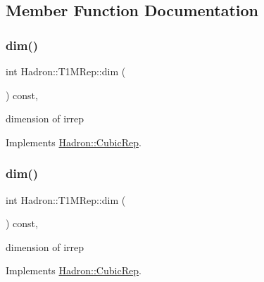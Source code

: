 \subsection{Member Function Documentation}
\mbox{\label{structHadron_1_1T1MRep_ad69f46dceb9157a51d1b682b107e5dff}} 
\subsubsection{\texorpdfstring{dim()}{dim()}\hspace{0.1cm}{\footnotesize\ttfamily [1/3]}}
{\footnotesize\ttfamily int Hadron\+::\+T1\+M\+Rep\+::dim (\begin{DoxyParamCaption}{ }\end{DoxyParamCaption}) const\hspace{0.3cm}{\ttfamily [inline]}, {\ttfamily [virtual]}}

dimension of irrep 

Implements \mbox{\hyperlink{structHadron_1_1CubicRep_ac178d14064f037a66af4b9fb4b312d51}{Hadron\+::\+Cubic\+Rep}}.

\mbox{\label{structHadron_1_1T1MRep_ad69f46dceb9157a51d1b682b107e5dff}} 
\subsubsection{\texorpdfstring{dim()}{dim()}\hspace{0.1cm}{\footnotesize\ttfamily [2/3]}}
{\footnotesize\ttfamily int Hadron\+::\+T1\+M\+Rep\+::dim (\begin{DoxyParamCaption}{ }\end{DoxyParamCaption}) const\hspace{0.3cm}{\ttfamily [inline]}, {\ttfamily [virtual]}}

dimension of irrep 

Implements \mbox{\hyperlink{structHadron_1_1CubicRep_ac178d14064f037a66af4b9fb4b312d51}{Hadron\+::\+Cubic\+Rep}}.

\mbox{\label{structHadron_1_1T1MRep_ad69f46dceb9157a51d1b682b107e5dff}} 
